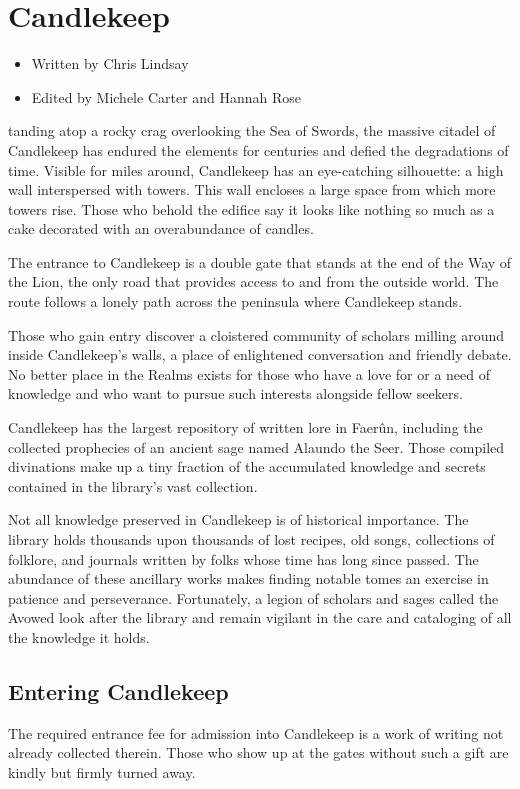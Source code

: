\documentclass[10pt,a4paper,twoside,bg=print,twocolumn,openany,nodeprecatedcode]{dndbook}
\begin{document}
\chapter{Candlekeep}

\begin{itemize}
\item Written by Chris Lindsay
\item Edited by Michele Carter and Hannah Rose
\end{itemize}

tanding atop a rocky crag overlooking the Sea of Swords, the massive citadel of Candlekeep has endured the elements for centuries and defied the degradations of time. Visible for miles around, Candlekeep has an eye-catching silhouette: a high wall interspersed with towers. This wall encloses a large space from which more towers rise. Those who behold the edifice say it looks like nothing so much as a cake decorated with an overabundance of candles.


The entrance to Candlekeep is a double gate that stands at the end of the Way of the Lion, the only road that provides access to and from the outside world. The route follows a lonely path across the peninsula where Candlekeep stands.

Those who gain entry discover a cloistered community of scholars milling around inside Candlekeep's walls, a place of enlightened conversation and friendly debate. No better place in the Realms exists for those who have a love for or a need of knowledge and who want to pursue such interests alongside fellow seekers.

Candlekeep has the largest repository of written lore in Faerûn, including the collected prophecies of an ancient sage named Alaundo the Seer. Those compiled divinations make up a tiny fraction of the accumulated knowledge and secrets contained in the library's vast collection.

Not all knowledge preserved in Candlekeep is of historical importance. The library holds thousands upon thousands of lost recipes, old songs, collections of folklore, and journals written by folks whose time has long since passed. The abundance of these ancillary works makes finding notable tomes an exercise in patience and perseverance. Fortunately, a legion of scholars and sages called the Avowed look after the library and remain vigilant in the care and cataloging of all the knowledge it holds.

\section{Entering Candlekeep}
The required entrance fee for admission into Candlekeep is a work of writing not already collected therein. Those who show up at the gates without such a gift are kindly but firmly turned away.
\end{document}
